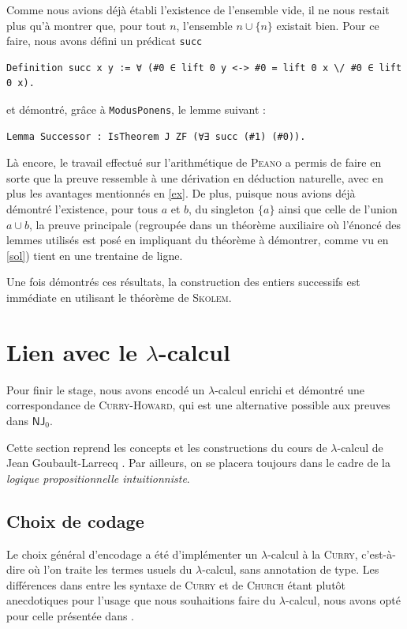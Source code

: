 \documentclass[a4paper]{article}
\newcommand{\NJ}{\mathsf{NJ}}
\begin{document}
Comme nous avions déjà établi l'existence de l'ensemble vide, il ne nous restait plus qu'à montrer que, pour tout $n$, l'ensemble $n \cup \{ n \}$ existait bien. Pour ce faire, nous avons défini un prédicat \verb+succ+
\begin{verbatim}
Definition succ x y := ∀ (#0 ∈ lift 0 y <-> #0 = lift 0 x \/ #0 ∈ lift 0 x).
\end{verbatim}
et démontré, grâce à \verb+ModusPonens+, le lemme suivant :
\begin{verbatim}
Lemma Successor : IsTheorem J ZF (∀∃ succ (#1) (#0)).
\end{verbatim}
Là encore, le travail effectué sur l'arithmétique de \textsc{Peano} a permis de faire en sorte que la preuve ressemble à une dérivation en déduction naturelle, avec en plus les avantages mentionnés en \ref{ex}. De plus, puisque nous avions déjà démontré l'existence, pour tous $a$ et $b$, du singleton $\{ a \}$ ainsi que celle de l'union $a \cup b$, la preuve principale (regroupée dans un théorème auxiliaire où l'énoncé des lemmes utilisés est posé en impliquant du théorème à démontrer, comme vu en \ref{sol}) tient en une trentaine de ligne.

Une fois démontrés ces résultats, la construction des entiers successifs est immédiate en utilisant le théorème de \textsc{Skolem}.

\newpage


\section{Lien avec le $\lambda$-calcul}

Pour finir le stage, nous avons encodé un $\lambda$-calcul enrichi et démontré une correspondance de \textsc{Curry-Howard}, qui est une alternative possible aux preuves dans $\NJ_0$.

Cette section reprend les concepts et les constructions du cours de $\lambda$-calcul de Jean Goubault-Larrecq \cite{polylam}. Par ailleurs, on se placera toujours dans le cadre de la \emph{logique propositionnelle intuitionniste}.

\subsection{Choix de codage}

Le choix général d'encodage a été d'implémenter un $\lambda$-calcul à la \textsc{Curry}, c'est-à-dire où l'on traite les termes usuels du $\lambda$-calcul, sans annotation de type. Les différences dans entre les syntaxe de \textsc{Curry} et de \textsc{Church} étant plutôt anecdotiques pour l'usage que nous souhaitions faire du $\lambda$-calcul, nous avons opté pour celle présentée dans \cite{polylam}.
\end{document}
